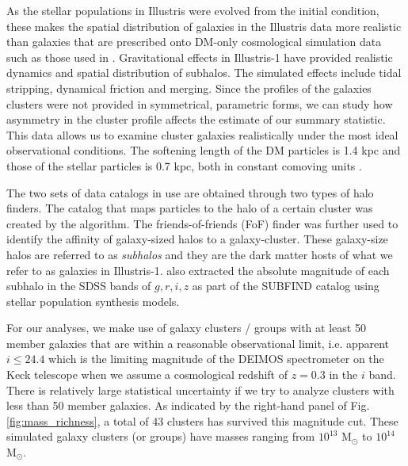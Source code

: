 As the stellar populations in Illustris were evolved from the initial condition,
these makes the spatial distribution of galaxies in the Illustris data more 
realistic than galaxies that are prescribed onto DM-only cosmological
simulation data such as those used in \cite{Harvey2013d}.  
Gravitational effects in Illustris-1 have provided realistic dynamics and
spatial distribution of subhalos. The simulated effects include
tidal stripping, dynamical friction and merging. 
Since the profiles of the galaxies clusters were not
provided in symmetrical, parametric forms, we can study 
how asymmetry in the cluster profile affects the estimate of our summary 
statistic. This data allows us to examine cluster galaxies
realistically under the most ideal observational conditions. 
The softening length of the DM particles is
1.4 kpc and those of the stellar particles is 
0.7 kpc, both in constant comoving units \citep{Genel2014a}.

The two sets of data catalogs in use are obtained through two types of halo
finders. The catalog that maps particles to the halo of a certain cluster was 
created by the {} algorithm. The friends-of-friends (FoF) 
finder \citep{Davis1985} was further used to identify the affinity
of galaxy-sized halos to a galaxy-cluster. 
These galaxy-size halos are referred to as {\it subhalos} and 
they are the dark matter hosts of what we refer to as galaxies in Illustris-1. 
\cite{Vogelsberger2014a} also extracted the 
absolute magnitude of each subhalo in
the SDSS bands of $g, r, i, z$ as part of the {\sc
SUBFIND} catalog using stellar population synthesis models.

For our analyses, we make use of galaxy clusters / groups 
with at least 50 member galaxies that are within a reasonable observational limit, 
i.e. apparent $i \leq 24.4$ which is the limiting magnitude of the DEIMOS
spectrometer on the Keck telescope when we assume a cosmological redshift of $z = 0.3$
in the $i$ band. %
There is relatively large statistical uncertainty if we try
to analyze clusters with less than 50 member galaxies. 
As indicated by the right-hand panel of Fig. \ref{fig:mass_richness}, 
a total of 43 clusters has 
survived this magnitude cut. These simulated galaxy clusters (or groups) have 
masses ranging from $10^{13}$ M$_\odot $ to $10^{14}$ M$_\odot$.  

